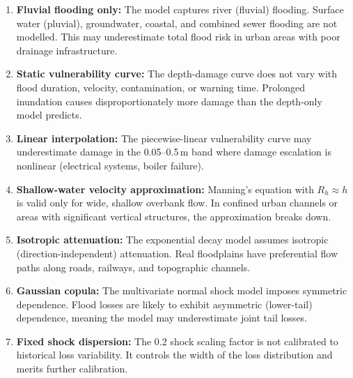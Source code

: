 \documentclass[11pt,a4paper]{article}
\begin{document}
\mkmlimitations

\begin{enumerate}
    \item \textbf{Fluvial flooding only:} The model captures river (fluvial) flooding.
          Surface water (pluvial), groundwater, coastal, and combined sewer flooding are
          not modelled. This may underestimate total flood risk in urban areas with poor
          drainage infrastructure.

    \item \textbf{Static vulnerability curve:} The depth-damage curve does not vary with
          flood duration, velocity, contamination, or warning time. Prolonged inundation
          causes disproportionately more damage than the depth-only model predicts.

    \item \textbf{Linear interpolation:} The piecewise-linear vulnerability curve may
          underestimate damage in the 0.05--0.5\,m band where damage escalation is
          nonlinear (electrical systems, boiler failure).

    \item \textbf{Shallow-water velocity approximation:} Manning's equation with
          $R_h \approx h$ is valid only for wide, shallow overbank flow. In confined
          urban channels or areas with significant vertical structures, the approximation
          breaks down.

    \item \textbf{Isotropic attenuation:} The exponential decay model assumes isotropic
          (direction-independent) attenuation. Real floodplains have preferential flow
          paths along roads, railways, and topographic channels.

    \item \textbf{Gaussian copula:} The multivariate normal shock model imposes symmetric
          dependence. Flood losses are likely to exhibit asymmetric (lower-tail) dependence,
          meaning the model may underestimate joint tail losses.

    \item \textbf{Fixed shock dispersion:} The 0.2 shock scaling factor is not calibrated
          to historical loss variability. It controls the width of the loss distribution
          and merits further calibration.


\end{enumerate}
\end{document}
